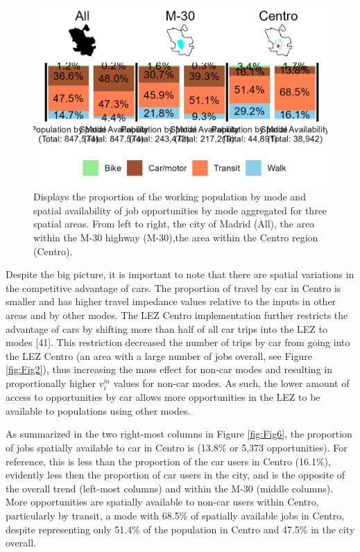 \documentclass[10pt,letterpaper]{article}
\begin{document}
\begin{figure}

{\centering \includegraphics[width=1\linewidth]{images/modal_V_comps_4plot} 

}

\caption{\label{fig:Fig6} Displays the proportion of the working population by mode and spatial availability of job opportunities by mode aggregated for three spatial areas. From left to right, the city of Madrid (All), the area within the M-30 highway (M-30),the area within the Centro region (Centro).}\label{fig:modal-V-comps-plot}
\end{figure}

Despite the big picture, it is important to note that there are spatial
variations in the competitive advantage of cars. The proportion of
travel by car in Centro is smaller and has higher travel impedance
values relative to the inputs in other areas and by other modes. The LEZ
Centro implementation further restricts the advantage of cars by
shifting more than half of all car trips into the LEZ to modes {[}41{]}.
This restriction decreased the number of trips by car from going into
the LEZ Centro (an area with a large number of jobs overall, see Figure
\ref{fig:Fig2}), thus increasing the mass effect for non-car modes and
resulting in proportionally higher \(v_i^m\) values for non-car modes.
As such, the lower amount of access to opportunities by car allows more
opportunities in the LEZ to be available to populations using other
modes.

As summarized in the two right-most columns in Figure \ref{fig:Fig6},
the proportion of jobs spatially available to car in Centro is (13.8\%
or 5,373 opportunities). For reference, this is less than the proportion
of the car users in Centro (16.1\%), evidently less then the proportion
of car users in the city, and is the opposite of the overall trend
(left-most columns) and within the M-30 (middle columns). More
opportunities are spatially available to non-car users within Centro,
particularly by transit, a mode with 68.5\% of spatially available jobs
in Centro, despite representing only 51.4\% of the population in Centro
and 47.5\% in the city overall.
\end{document}
